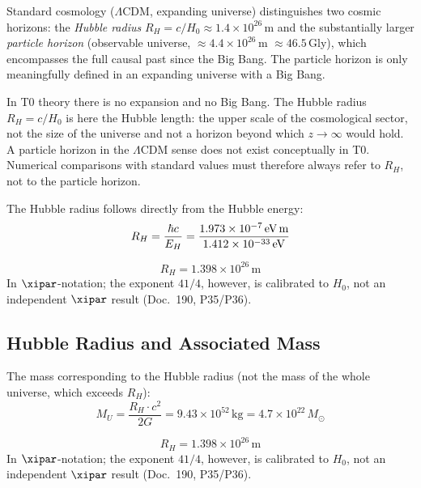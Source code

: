\begin{foundation}
Standard cosmology ($\Lambda$CDM, expanding universe) distinguishes two cosmic horizons: the \textit{Hubble radius} $R_H = c/H_0 \approx 1{.}4 \times 10^{26}$\,m and the substantially larger \textit{particle horizon} (observable universe, $\approx 4{.}4 \times 10^{26}$\,m $\approx 46.5$\,Gly), which encompasses the full causal past since the Big Bang. The particle horizon is only meaningfully defined in an expanding universe with a Big Bang.

In T0 theory there is no expansion and no Big Bang. The Hubble radius $R_H = c/H_0$ is here the Hubble length: the upper scale of the cosmological sector, not the size of the universe and not a horizon beyond which $z \to \infty$ would hold. A particle horizon in the $\Lambda$CDM sense does not exist conceptually in T0. Numerical comparisons with standard values must therefore always refer to $R_H$, not to the particle horizon.
\end{foundation}

The Hubble radius follows directly from the Hubble energy:
\begin{equation}
	R_H = \frac{\hbar c}{E_H} = \frac{1{.}973 \times 10^{-7}\,\text{eV\,m}}{1{.}412 \times 10^{-33}\,\text{eV}}
\end{equation}

\begin{keyresult}
\begin{equation}
	\boxed{R_H = 1{.}398 \times 10^{26}\,\text{m}}
\end{equation}
In $\xipar$-notation; the exponent $41/4$, however, is calibrated to $H_0$, not an independent $\xipar$ result (Doc.~190, P35/P36).
\end{keyresult}

\subsection{Hubble Radius and Associated Mass}

The mass corresponding to the Hubble radius (not the mass of the whole universe, which exceeds $R_H$):
\begin{equation}
	M_U = \frac{R_H \cdot c^2}{2G} = 9{.}43 \times 10^{52}\,\text{kg} = 4{.}7 \times 10^{22}\,M_\odot
\end{equation}

\begin{keyresult}
\begin{equation}
	\boxed{R_H = 1{.}398 \times 10^{26}\,\text{m}}
\end{equation}
In $\xipar$-notation; the exponent $41/4$, however, is calibrated to $H_0$, not an independent $\xipar$ result (Doc.~190, P35/P36).
\end{keyresult}

